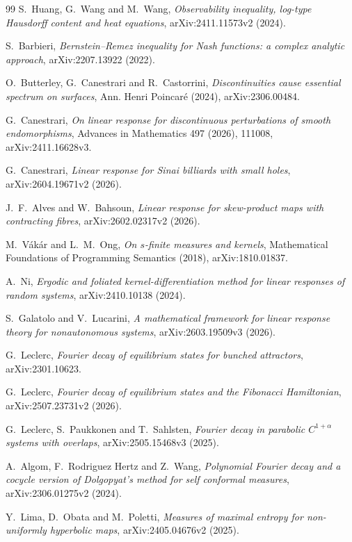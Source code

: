 \documentclass[11pt]{article}
\begin{document}
\begin{thebibliography}{99}
S.~Huang, G.~Wang and M.~Wang,
\emph{Observability inequality, log-type Hausdorff content and heat equations},
arXiv:2411.11573v2 (2024).

S.~Barbieri,
\emph{Bernstein--Remez inequality for Nash functions: a complex analytic
approach}, arXiv:2207.13922 (2022).

O.~Butterley, G.~Canestrari and R.~Castorrini,
\emph{Discontinuities cause essential spectrum on surfaces},
Ann. Henri Poincar\'e (2024), arXiv:2306.00484.

G.~Canestrari,
\emph{On linear response for discontinuous perturbations of smooth
endomorphisms}, Advances in Mathematics 497 (2026), 111008,
arXiv:2411.16628v3.

G.~Canestrari,
\emph{Linear response for Sinai billiards with small holes},
arXiv:2604.19671v2 (2026).

J.~F.~Alves and W.~Bahsoun,
\emph{Linear response for skew-product maps with contracting fibres},
arXiv:2602.02317v2 (2026).

M.~V\'ak\'ar and L.~M.~Ong,
\emph{On $s$-finite measures and kernels},
Mathematical Foundations of Programming Semantics (2018),
arXiv:1810.01837.

A.~Ni,
\emph{Ergodic and foliated kernel-differentiation method for linear
responses of random systems}, arXiv:2410.10138 (2024).

S.~Galatolo and V.~Lucarini,
\emph{A mathematical framework for linear response theory for nonautonomous
systems}, arXiv:2603.19509v3 (2026).

G.~Leclerc,
\emph{Fourier decay of equilibrium states for bunched attractors},
arXiv:2301.10623.

G.~Leclerc,
\emph{Fourier decay of equilibrium states and the Fibonacci Hamiltonian},
arXiv:2507.23731v2 (2026).

G.~Leclerc, S.~Paukkonen and T.~Sahlsten,
\emph{Fourier decay in parabolic $C^{1+\alpha}$ systems with overlaps},
arXiv:2505.15468v3 (2025).

A.~Algom, F.~Rodriguez Hertz and Z.~Wang,
\emph{Polynomial Fourier decay and a cocycle version of Dolgopyat's method
for self conformal measures}, arXiv:2306.01275v2 (2024).

Y.~Lima, D.~Obata and M.~Poletti,
\emph{Measures of maximal entropy for non-uniformly hyperbolic maps},
arXiv:2405.04676v2 (2025).


\end{thebibliography}
\end{document}
